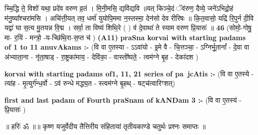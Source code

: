 \documentclass[17pt]{extarticle}
\begin{document}
                  च्चि॒द्धि ते॒ विशो॑ यथा॒ प्रदे॑व वरुण व्र॒तं । मि॒नी॒मसि॒ द्यवि॑द्यवि ॥यत् किञ्चे॒दं ॅव॑रुण॒ दैव्ये॒ जने॑ऽभिद्रो॒हं म॑नु॒ष्या᳚श्चरा॑मसि । अचि॑त्ती॒यत् तव॒ धर्मा॑ युयोपि॒ममा न॒स्तस्मा॒ देन॑सो देव रीरिषः ॥ कि॒त॒वासो॒ यद्रि॑ रि॒पुर्न दी॒वि यद्वा॑ घा स॒त्य मु॒तयन्न वि॒द्म । सर्वा॒ ता विष्य॑ शिथि॒रे ( ) व॑ दे॒वाथा॑ ते स्याम वरुण प्रि॒यासः॑ ॥ \textbf{  46} \newline
                  \newline
                      (सोमो॒-गोषु॒ मा- र॒यिं - मन्त्रो॒ -य-च्छि॑थि॒रा-स॒प्त च॑ )  \textbf{(A11)} \newline \newline
                \textbf{praSna korvai with starting padams of 1 to 11 anuvAkams :-} \newline
        (वि वा ए॒तस्या - ऽऽवा॑यो - इ॒मे वै - चि॒त्तञ्चा॒ - ऽग्निर्भू॒तानां᳚ - दे॒वा वा अ॑भ्याता॒ना - नृ॑ता॒षाड् - रा॒ष्ट्रका॑माय॒ - देवि॑का॒ - वास्तो᳚ष्पते॒ - त्वम॑ग्ने बृ॒ह - देका॑दश ) \newline

        \textbf{korvai with starting padams of1, 11, 21 series of pa~jcAtis :-} \newline
        (वि वा ए॒तस्ये - त्या॑ह - मृ॒त्युर्ग॑न्ध॒र्वो - ऽव॑ रुन्धे मद्ध्य॒त - स्त्वम॑ग्ने बृ॒हथ् - षट्च॑त्वारिꣳशत्) \newline

        \textbf{first and last padam of Fourth praSnam of kANDam 3 :-} \newline
        (वि वा ए॒तस्य॑ - प्रि॒यासः॑ ) \newline 

        
        ॥ हरिः॑ ॐ ॥॥ कृष्ण यजुर्वेदीय तैत्तिरीय संहितायां तृतीयकाण्डे चतुर्थः प्रश्नः समाप्तः ॥ \newline
        \pagebreak
                \pagebreak
        
\end{document}
